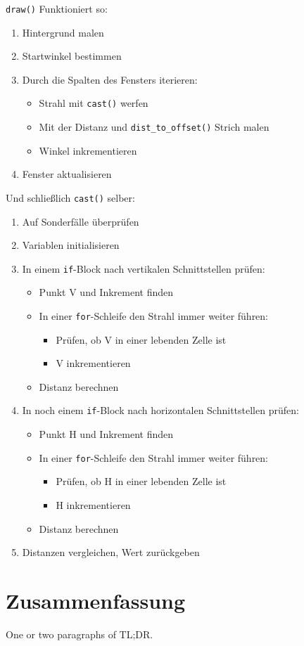 \documentclass[a4paper,12pt]{report}
\begin{document}
\texttt{draw()} Funktioniert so:
\begin{spacing}{1.0}
\begin{framed}
\begin{enumerate}
	\item Hintergrund malen
	\item Startwinkel bestimmen
	\item Durch die Spalten des Fensters iterieren:
	\begin{itemize}
		\item Strahl mit \texttt{cast()} werfen
		\item Mit der Distanz und \texttt{dist\_to\_offset()} Strich malen
		\item Winkel inkrementieren
	\end{itemize}
	\item Fenster aktualisieren
\end{enumerate}
\end{framed}
\end{spacing}

Und schließlich \texttt{cast()} selber:
\begin{spacing}{1.0}
\begin{framed}
\begin{enumerate}
	\item Auf Sonderfälle überprüfen
	\item Variablen initialisieren
	\item In einem \texttt{if}-Block nach vertikalen Schnittstellen prüfen:
	\begin{itemize}
		\item Punkt V und Inkrement finden
		\item In einer \texttt{for}-Schleife den Strahl immer weiter führen:
		\begin{itemize}
			\item Prüfen, ob V in einer lebenden Zelle ist
			\item V inkrementieren
		\end{itemize}
		\item Distanz berechnen
	\end{itemize}
	\item In noch einem \texttt{if}-Block nach horizontalen Schnittstellen prüfen:
	\begin{itemize}
		\item Punkt H und Inkrement finden
		\item In einer \texttt{for}-Schleife den Strahl immer weiter führen:
		\begin{itemize}
			\item Prüfen, ob H in einer lebenden Zelle ist
			\item H inkrementieren
		\end{itemize}
		\item Distanz berechnen
	\end{itemize}
	\item Distanzen vergleichen, Wert zurückgeben
\end{enumerate}
\end{framed}
\end{spacing}


\chapter{Zusammenfassung}
One or two paragraphs of TL;DR.
\end{document}
